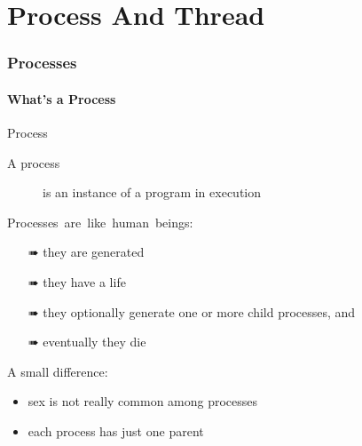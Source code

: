 \mode*
\part{Process And Thread}


\section{Processes}
\label{sec:processes}

\subsection{What's a Process}
\label{sec:whats-process}

\begin{frame}{Process}
  \begin{description}
  \item[A process] is an instance of a program in execution
  \end{description}
  \begin{minipage}{.65\linewidth}
    \begin{block}{\mbox{Processes are like human beings:}}
        \begin{itemize}
        \item[\symbola ➠] they are generated
        \item[\symbola ➠] they have a life
        \item[\symbola ➠] they optionally generate one or more child processes, and
        \item[\symbola ➠] eventually they die
        \end{itemize}
        A small difference:
        \begin{itemize}
        \item sex is not really common among processes
        \item each process has just one parent
        \end{itemize}
      \end{block}
  \end{minipage}\quad
  \begin{minipage}{.3\linewidth}
    \begin{center}
    \end{center}
  \end{minipage}
\end{frame}

